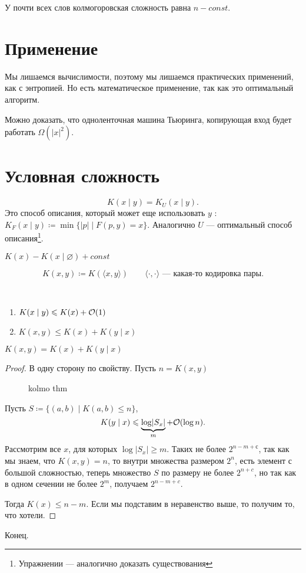 \begin{cor}
    У почти всех слов колмогоровская сложность равна $ n- const$.
\end{cor}

\section{Применение}
Мы лишаемся вычислимости, поэтому мы лишаемся практических применений, как с энтропией. Но есть математическое применение, так как это оптимальный алгоритм.

Можно доказать, что одноленточная машина Тьюринга, копирующая вход будет работать $ \Omega( \lvert x \rvert ^2)$.

\section{Условная сложность}
\[
	K(x \mid y) = K_{U}\left( x \mid y \right) 
.\] 
Это способ описания, который может еще использовать $ y$ : 
$ K_{F}(x \mid y) \coloneqq \min \{\lvert p \rvert \mid F(p, y) = x\}$. Аналогично $ U$ --- оптимальный способ описания\footnote{Упражнении --- аналогично доказать существования}.

\begin{note}
	$ K(x) - K(x \mid \varnothing) + const$
\end{note}
\[
	K(x, y) \coloneqq K(\langle x, y \rangle) \qquad \langle\cdot  , \cdot \rangle\text{ --- какая-то кодировка пары}
.\] 
\begin{prop}
    ~\begin{enumerate}
		\item $ K(x \mid y) \leqslant  K(x) + \mathcal{O}(1)$
		\item $ K(x, y) \le  K(x) + K(y \mid x)$
    \end{enumerate}
\end{prop}

\begin{thm}
	$ K(x, y) =  K(x) + K(y \mid x)$
\end{thm}
\begin{proof}
	В одну сторону по свойству. Пусть  $ n = K(x, y) $ 
\begin{figure}[ht]
    \centering
    \caption{kolmo thm}
    \label{fig:kolmo-thm}
\end{figure}
Пусть $ S \coloneqq \{(a, b) \mid K(a, b) \le n\}$,
\[
	K(y \mid x) \leqslant  \underbrace{\log \lvert   S_x\rvert}_{m} + \mathcal{O}(\log n)
.\] 
Рассмотрим все $ x$, для которых $ \log \lvert S_x \rvert  \ge  m$. Таких не более $ 2^{n-m + с}$, так как мы знаем, что $ K(x, y) = n$, то внутри множества размером  $ 2^{n}$, есть элемент с большой сложностью, теперь множество $ S$ по размеру не более  $ 2^{n+c}$, но так как в одном сечении не более $ 2^{m}$, получаем  $ 2^{n-m+c}$.

Тогда $ K(x) \le n -m $. Если мы подставим в неравенство выше, то получим то, что хотели.
\end{proof}
Конец.
